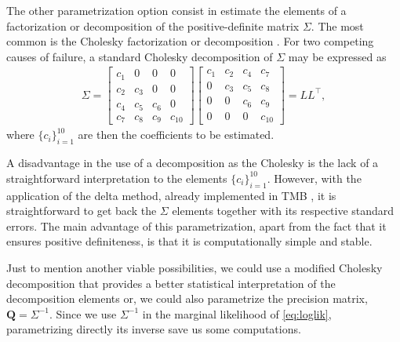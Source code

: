 The other parametrization option consist in estimate the elements of a
factorization or decomposition of the positive-definite matrix
\(\Sigma\). The most common is the Cholesky factorization or
decomposition \cite{cholesky}. For two competing causes of failure, a
standard Cholesky decomposition of \(\Sigma\) may be expressed as
\begin{align*}
 \Sigma = \begin{bmatrix}
           c_{1}&0&0&0\\
           c_{2}&c_{3}&0&0\\
           c_{4}&c_{5}&c_{6}&0\\
           c_{7}&c_{8}&c_{9}&c_{10}
         \end{bmatrix}\begin{bmatrix}
                       c_{1}&c_{2}&c_{4}&c_{7}\\
                       0&c_{3}&c_{5}&c_{8}\\
                       0&0&c_{6}&c_{9}\\
                       0&0&0&c_{10}
                      \end{bmatrix} = LL^{\top},
\end{align*}
where \(\{c_{i}\}_{i=1}^{10}\) are then the coefficients to be estimated.

A disadvantage in the use of a decomposition as the Cholesky is the lack
of a straightforward interpretation to the elements
\(\{c_{i}\}_{i=1}^{10}\). However, with the application of the delta
method, already implemented in TMB \cite{TMB}, it is straightforward to
get back the \(\Sigma\) elements together with its respective standard
errors. The main advantage of this parametrization, apart from the fact
that it ensures positive definiteness, is that it is computationally
simple and stable.

Just to mention another viable possibilities, we could use a modified
Cholesky decomposition \cite{modifiedcholesky} that provides a better
statistical interpretation of the decomposition elements or, we could
also parametrize the precision matrix, \(\bm{Q} = \Sigma^{-1}\). Since
we use \(\Sigma^{-1}\) in the marginal likelihood of
\autoref{eq:loglik}, parametrizing directly its inverse save us some
computations.

